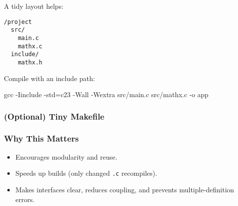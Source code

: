 \documentclass[
  letterpaper,
  DIV=11,
  numbers=noendperiod]{scrreprt}
\newenvironment{Shaded}{\begin{snugshade}}{\end{snugshade}}
\newcommand{\AttributeTok}[1]{\textcolor[rgb]{0.40,0.45,0.13}{#1}}
\newcommand{\FunctionTok}[1]{\textcolor[rgb]{0.28,0.35,0.67}{#1}}
\newcommand{\NormalTok}[1]{\textcolor[rgb]{0.00,0.23,0.31}{#1}}
\newcommand{\OperatorTok}[1]{\textcolor[rgb]{0.37,0.37,0.37}{#1}}
\providecommand{\tightlist}{%
  \setlength{\itemsep}{0pt}\setlength{\parskip}{0pt}}
\begin{document}
A tidy layout helps:

\begin{verbatim}
/project
  src/
    main.c
    mathx.c
  include/
    mathx.h
\end{verbatim}

Compile with an include path:

\begin{Shaded}
\begin{Highlighting}[]
\FunctionTok{gcc} \AttributeTok{{-}Iinclude} \AttributeTok{{-}std}\OperatorTok{=}\NormalTok{c23 }\AttributeTok{{-}Wall} \AttributeTok{{-}Wextra}\NormalTok{ src/main.c src/mathx.c }\AttributeTok{{-}o}\NormalTok{ app}
\end{Highlighting}
\end{Shaded}

\subsubsection{(Optional) Tiny Makefile}\label{optional-tiny-makefile}

\begin{Shaded}
\end{Shaded}

\subsubsection{Why This Matters}\label{why-this-matters}

\begin{itemize}
\tightlist
\item
  Encourages modularity and reuse.
\item
  Speeds up builds (only changed \texttt{.c} recompiles).
\item
  Makes interfaces clear, reduces coupling, and prevents
  multiple-definition errors.
\end{itemize}
\end{document}
